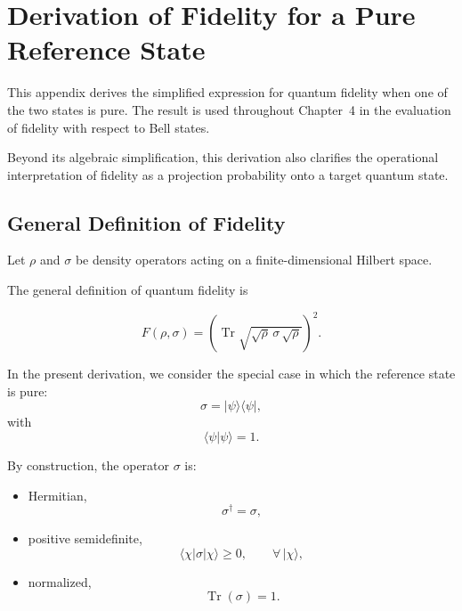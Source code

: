 
\section{Derivation of Fidelity for a Pure Reference State}
\label{app:fidelity_pure_reference_state}

This appendix derives the simplified expression for quantum fidelity when one of the two states is pure. The result is used throughout Chapter~4 in the evaluation of fidelity with respect to Bell states.

\medskip

Beyond its algebraic simplification, this derivation also clarifies the operational interpretation of fidelity as a projection probability onto a target quantum state.


\subsection*{General Definition of Fidelity}

Let \( \rho \) and \( \sigma \) be density operators acting on a finite-dimensional Hilbert space.

The general definition of quantum fidelity is

\begin{equation}
F(\rho,\sigma)
=
\left(
\operatorname{Tr}
\sqrt{
\sqrt{\rho}\,
\sigma\,
\sqrt{\rho}
}
\right)^2.
\label{eq:general_fidelity_definition}
\end{equation}

In the present derivation, we consider the special case in which the reference state is pure:
\begin{equation}
\sigma
=
|\psi\rangle\langle\psi|,
\label{eq:pure_reference_density_operator}
\end{equation}
with
\begin{equation}
\langle \psi | \psi \rangle = 1.
\label{eq:pure_state_normalization}
\end{equation}

By construction, the operator \( \sigma \) is:

\begin{itemize}
    \item Hermitian,
    \[
    \sigma^\dagger = \sigma,
    \]

    \item positive semidefinite,
    \[
    \langle \chi | \sigma | \chi \rangle \ge 0,
    \qquad
    \forall\,|\chi\rangle,
    \]

    \item normalized,
    \[
    \operatorname{Tr}(\sigma)=1.
    \]
\end{itemize}


